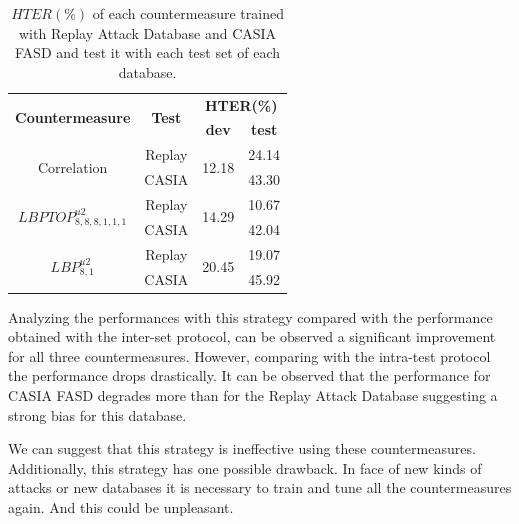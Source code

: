 \begin{table}[ht]
\caption{$HTER(\%)$  of each countermeasure trained with Replay Attack Database and CASIA FASD and test it with each test set of each database.}
\begin{center}
  \begin{tabular}{ | c | c | c  c |}
    \hline

   \multirow{2}{*}{\textbf{Countermeasure}} &  \multirow{2}{*}{\textbf{Test}} & \multicolumn{2}{c|}{\textbf{HTER(\%)}} \\ 
    &&\textbf{dev} & \textbf{test}  \\ \hline
    
    \multirow{2}{*}{Correlation} & Replay  &  \multirow{2}{*}{12.18} & 24.14 \\ 
               & CASIA &  & 43.30  \\ \hline \hline

    \multirow{2}{*}{$LBPTOP_{8,8,8,1,1,1}^{u2}$}  & Replay  & \multirow{2}{*}{14.29} & 10.67 \\
               &  CASIA  & & 42.04  \\ \hline \hline

    \multirow{2}{*}{$LBP_{8,1}^{u2}$}  & Replay  & \multirow{2}{*}{20.45} &19.07 \\
                & CASIA  &  & 45.92 \\
    \hline
  \end{tabular}
\end{center}
\label{tb:TrainAllTest}
\end{table}

Analyzing the performances with this strategy compared with the performance obtained with the inter-set protocol, can be observed a significant improvement for all three countermeasures. However, comparing with the intra-test protocol the performance drops drastically. It can be observed that the performance for CASIA FASD degrades more than for the Replay Attack Database suggesting a strong bias for this database. 

We can suggest that this strategy is ineffective using these countermeasures. Additionally, this strategy has one possible drawback. In face of new kinds of attacks or new databases it is necessary to train and tune all the countermeasures again. And this could be unpleasant.





